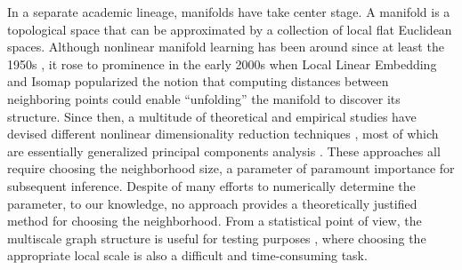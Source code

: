 \documentclass[11pt]{article}
\begin{document}
In a separate academic lineage, manifolds have take center stage.  A manifold is a topological space that can be approximated by a collection of local flat Euclidean spaces.  Although nonlinear manifold learning has been around since at least the 1950s \cite{TorgersonBook}, it rose to prominence in the early 2000s when Local Linear Embedding \cite{SaulRoweis2000} and Isomap \cite{TenenbaumSilvaLangford2000} popularized the notion that computing distances between neighboring points could enable ``unfolding'' the manifold to discover its structure.  Since then, a multitude of theoretical and empirical studies have devised different nonlinear dimensionality reduction techniques \cite{LeeVerleysen2007}, most of which are essentially generalized principal components analysis \cite{ScholkopfSmolaMuller1999}.  These approaches all require choosing the neighborhood size, a parameter of paramount importance for subsequent inference. Despite of many efforts to numerically determine the parameter, to our knowledge, no approach provides a theoretically justified method for choosing the neighborhood. From a statistical point of view, the multiscale graph structure is useful for testing purposes \cite{David1966,Friedman1983,Schilling1986,Dumcke2014,HHG2016}, where choosing the appropriate local scale is also a difficult and time-consuming task. 
\end{document}
